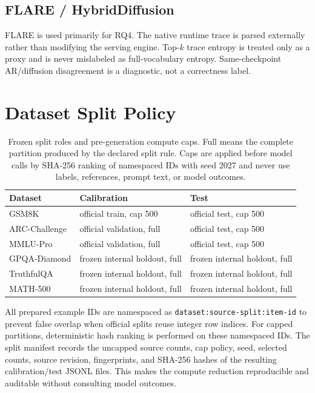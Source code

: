 \subsection{FLARE / HybridDiffusion}

FLARE is used primarily for RQ4.
The native runtime trace is parsed externally rather than modifying the serving engine.
Top-$k$ trace entropy is treated only as a proxy and is never mislabeled as full-vocabulary entropy.
Same-checkpoint AR/diffusion disagreement is a diagnostic, not a correctness label.

\section{Dataset Split Policy}

\begin{table}[t]
\centering
\small
\begin{tabular}{p{}p{}p{}}
\toprule
Dataset & Calibration & Test\\
\midrule
GSM8K & official train, cap 500 & official test, cap 500\\
ARC-Challenge & official validation, full & official test, cap 500\\
MMLU-Pro & official validation, full & official test, cap 500\\
GPQA-Diamond & frozen internal holdout, full & frozen internal holdout, full\\
TruthfulQA & frozen internal holdout, full & frozen internal holdout, full\\
MATH-500 & frozen internal holdout, full & frozen internal holdout, full\\
\bottomrule
\end{tabular}
\caption{Frozen split roles and pre-generation compute caps. Full means the
complete partition produced by the declared split rule. Caps are applied
before model calls by SHA-256 ranking of namespaced IDs with seed 2027 and never
use labels, references, prompt text, or model outcomes.}
\label{tab:dataset-split-policy}
\end{table}

All prepared example IDs are namespaced as
\texttt{dataset:source-split:item-id}
to prevent false overlap when official splits reuse integer row indices.
For capped partitions, deterministic hash ranking is performed on these
namespaced IDs. The split manifest records the uncapped source counts, cap
policy, seed, selected counts, source revision, fingerprints, and SHA-256
hashes of the resulting calibration/test JSONL files. This makes the compute
reduction reproducible and auditable without consulting model outcomes.

